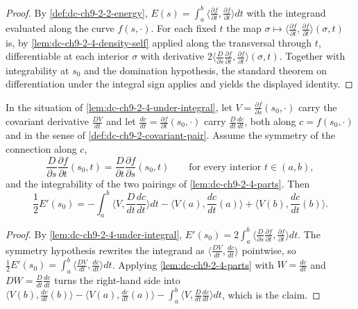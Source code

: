 \begin{proof}
  \leanok
  \sketch
  By \cref{def:dc-ch9-2-2-energy}, $E(s)=\int_a^b\langle\frac{\partial f}{\partial t},\frac{\partial f}{\partial t}\rangle dt$
  with the integrand evaluated along the curve $f(s,\cdot)$. For each fixed $t$ the map
  $\sigma\mapsto\langle\frac{\partial f}{\partial t},\frac{\partial f}{\partial t}\rangle(\sigma,t)$
  is, by \cref{lem:dc-ch9-2-4-density-self} applied along the transversal through $t$,
  differentiable at each interior $\sigma$ with derivative
  $2\langle\frac{D}{\partial s}\frac{\partial f}{\partial t},\frac{\partial f}{\partial t}\rangle(\sigma,t)$.
  Together with integrability at $s_0$ and the domination hypothesis, the standard theorem
  on differentiation under the integral sign applies and yields the displayed identity.

\end{proof}
\begin{lemma}
  \label{lem:dc-ch9-2-4-segment}
  \leanok
  In the situation of \cref{lem:dc-ch9-2-4-under-integral}, let $V=\frac{\partial f}{\partial s}(s_0,\cdot)$
  carry the covariant derivative $\frac{DV}{dt}$ and let $\frac{dc}{dt}=\frac{\partial f}{\partial t}(s_0,\cdot)$
  carry $\frac{D}{dt}\frac{dc}{dt}$, both along $c=f(s_0,\cdot)$ and in the sense of
  \cref{def:dc-ch9-2-covariant-pair}. Assume the symmetry of the connection along $c$,
  $$
  \frac{D}{\partial s}\frac{\partial f}{\partial t}(s_0,t)=\frac{D}{\partial t}\frac{\partial f}{\partial s}(s_0,t)
  \qquad\text{for every interior }t\in(a,b),
  $$
  and the integrability of the two pairings of \cref{lem:dc-ch9-2-4-parts}. Then
  $$
  \frac{1}{2}E'(s_0)
    = -\int_a^b\Big\langle V,\frac{D}{dt}\frac{dc}{dt}\Big\rangle dt
      -\Big\langle V(a),\frac{dc}{dt}(a)\Big\rangle
      +\Big\langle V(b),\frac{dc}{dt}(b)\Big\rangle .
  $$

\end{lemma}
\begin{proof}
  \leanok
  \sketch
  By \cref{lem:dc-ch9-2-4-under-integral},
  $E'(s_0)=2\int_a^b\langle\frac{D}{\partial s}\frac{\partial f}{\partial t},\frac{\partial f}{\partial t}\rangle dt$.
  The symmetry hypothesis rewrites the integrand as
  $\langle\frac{DV}{dt},\frac{dc}{dt}\rangle$ pointwise, so
  $\frac{1}{2}E'(s_0)=\int_a^b\langle\frac{DV}{dt},\frac{dc}{dt}\rangle dt$. Applying
  \cref{lem:dc-ch9-2-4-parts} with $W=\frac{dc}{dt}$ and $DW=\frac{D}{dt}\frac{dc}{dt}$
  turns the right-hand side into
  $\langle V(b),\frac{dc}{dt}(b)\rangle-\langle V(a),\frac{dc}{dt}(a)\rangle
  -\int_a^b\langle V,\frac{D}{dt}\frac{dc}{dt}\rangle dt$, which is the claim.
\end{proof}
